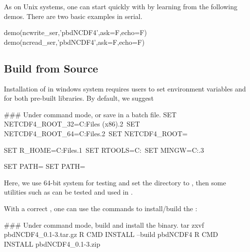 As on Unix systems,
one can start quickly with  by learning from the
following demos. There are two basic examples in serial.
\begin{Command}
demo(ncwrite_ser,'pbdNCDF4',ask=F,echo=F)
demo(ncread_ser,'pbdNCDF4',ask=F,echo=F)
\end{Command}


\subsection[Build from Source]{Build from Source}
\label{sec:building_from_source}

Installation of  in windows system requires users to set
environment variables  and
 for both pre-built libraries.
By default, we suggest
\begin{Command}
### Under command mode, or save in a batch file.
SET NETCDF4_ROOT_32=C:\Program Files (x86).2\
SET NETCDF4_ROOT_64=C:\Program Files.2\
SET NETCDF4_ROOT=%

SET R_HOME=C:\Program Files\R{}.1\
SET RTOOLS=C:\Rtools\bin\
SET MINGW=C:\Rtools{}.3\bin\

SET PATH=%
SET PATH=%
\end{Command}
Here, we use 64-bit system for testing and set the  directory
to \code{PATH}, then
some utilities such as  can be tested and used in
.

With a correct , one can use the  commands
to install/build the \pkg{pbdNCDF4}:
\begin{Command}
### Under command mode, build and install the binary.
tar zxvf pbdNCDF4_0.1-3.tar.gz
R CMD INSTALL --build pbdNCDF4
R CMD INSTALL pbdNCDF4_0.1-3.zip
\end{Command}


